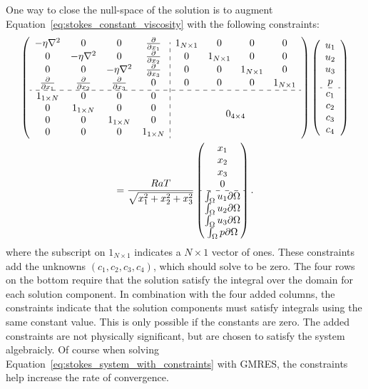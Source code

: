 One way to close the null-space of the solution is to augment Equation~\ref{eq:stokes_constant_viscosity} with the following constraints: 
\begin{multline}
\left(\begin{array}{cccc:cccc}  
-\eta \Laplacian & 0 & 0 & \pd{}{x_1} & 1_{N \times 1} & 0 & 0 & 0 \\ 
0 & -\eta \Laplacian & 0 & \pd{}{x_2} & 0 & 1_{N \times 1} & 0 & 0\\ 
0 & 0 & -\eta \Laplacian & \pd{}{x_3} & 0 & 0 & 1_{N \times 1} & 0\\ 
\pd{}{x_1} & \pd{}{x_2} & \pd{}{x_3} & 0 & 0 & 0 & 0 & 1_{N \times 1}\\
\hdashline
1_{1 \times N} & 0 & 0 & 0 & \multicolumn{4}{c}{\multirow{4}{*}{$0_{4 \times 4}$}} \\
0 & 1_{1 \times N} & 0 & 0 & \\
0 & 0 & 1_{1 \times N} & 0 & \\ 
0 & 0 & 0 & 1_{1 \times N} & \\
\end{array} \right) \left(\begin{array}{c} 
u_1 \\ u_2 \\ u_3 \\ p \\ \hdashline c_1 \\ c_2 \\ c_3 \\ c_4
\end{array} \right) \\
 = \frac{RaT}{\sqrt{x_1^2 + x_2^2 + x_3^2}}\begin{pmatrix} x_1 \\ x_2 \\ x_3 \\ 0 \\ \hdashline \int_\Omega u_1 \partial\Omega \\ \int_\Omega u_2 \partial\Omega \\ \int_\Omega u_3 \partial\Omega \\ \int_\Omega p \partial\Omega \end{pmatrix}.
\label{eq:stokes_system_with_constraints}
\end{multline}
where the subscript on $1_{N \times 1}$ indicates a $N \times 1$ vector of ones. These constraints add the unknowns $(c_1, c_2, c_3, c_4)$, which should solve to be zero. The four rows on the bottom require that the solution satisfy the integral over the domain for each solution component. In combination with the four added columns, the constraints indicate that the solution components must satisfy integrals using the same constant value. This is only possible if the constants are zero. The added constraints are not physically significant, but are chosen to satisfy the system algebraicly. Of course when solving Equation~\ref{eq:stokes_system_with_constraints} with GMRES, the constraints help increase the rate of convergence. 

